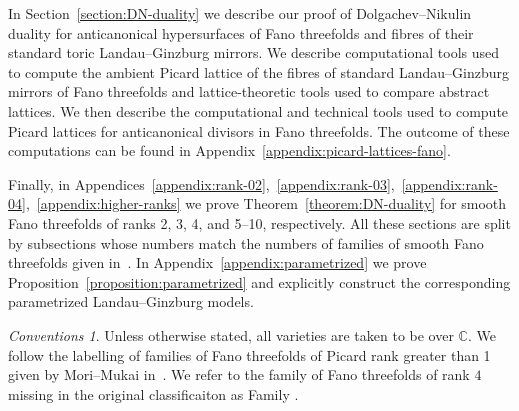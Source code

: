 \documentclass[10pt]{amsart}
\numberwithin{equation}{section}
\theoremstyle{plain}
\theoremstyle{definition}
\theoremstyle{remark}
\newtheorem*{conventions}{Conventions}
\begin{document}
In Section~\ref{section:DN-duality} we describe our proof of Dolgachev--Nikulin duality for anticanonical hypersurfaces of Fano threefolds and fibres of their standard toric Landau--Ginzburg mirrors. We describe computational tools used to compute the ambient Picard lattice of the fibres of standard Landau--Ginzburg mirrors of Fano threefolds and lattice-theoretic tools used to compare abstract lattices. We then describe the computational and technical tools used to compute Picard lattices for anticanonical divisors in Fano threefolds. The outcome of these computations can be found in Appendix~\ref{appendix:picard-lattices-fano}.

Finally, in Appendices~\ref{appendix:rank-02},~\ref{appendix:rank-03},~\ref{appendix:rank-04},~\ref{appendix:higher-ranks} we prove Theorem~\ref{theorem:DN-duality} for smooth Fano threefolds of ranks 2, 3, 4, and 5--10, respectively. All these sections are split by subsections whose numbers match the numbers of families of smooth Fano threefolds given in~\cite{coates2016quantum}. In Appendix~\ref{appendix:parametrized} we prove Proposition~\ref{proposition:parametrized} and explicitly construct the corresponding parametrized Landau--Ginzburg models.

\begin{conventions}
  Unless otherwise stated, all varieties are taken to be over \(\mathbb{C}\). We follow the labelling of families of Fano threefolds of Picard rank greater than 1 given by Mori--Mukai in~\cite{mori1981classification}. We refer to the family of Fano threefolds of rank \(4\) missing in the original classificaiton as Family .
\end{conventions}
\end{document}
